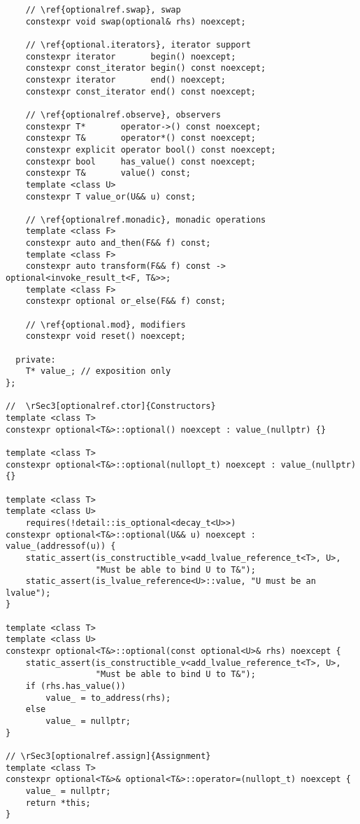 \documentclass[a4paper,10pt,oneside,openany,final,article]{memoir}
\begin{document}
\begin{verbatim}
    // \ref{optionalref.swap}, swap
    constexpr void swap(optional& rhs) noexcept;

    // \ref{optional.iterators}, iterator support
    constexpr iterator       begin() noexcept;
    constexpr const_iterator begin() const noexcept;
    constexpr iterator       end() noexcept;
    constexpr const_iterator end() const noexcept;

    // \ref{optionalref.observe}, observers
    constexpr T*       operator->() const noexcept;
    constexpr T&       operator*() const noexcept;
    constexpr explicit operator bool() const noexcept;
    constexpr bool     has_value() const noexcept;
    constexpr T&       value() const;
    template <class U>
    constexpr T value_or(U&& u) const;

    // \ref{optionalref.monadic}, monadic operations
    template <class F>
    constexpr auto and_then(F&& f) const;
    template <class F>
    constexpr auto transform(F&& f) const -> optional<invoke_result_t<F, T&>>;
    template <class F>
    constexpr optional or_else(F&& f) const;

    // \ref{optional.mod}, modifiers
    constexpr void reset() noexcept;

  private:
    T* value_; // exposition only
};

//  \rSec3[optionalref.ctor]{Constructors}
template <class T>
constexpr optional<T&>::optional() noexcept : value_(nullptr) {}

template <class T>
constexpr optional<T&>::optional(nullopt_t) noexcept : value_(nullptr) {}

template <class T>
template <class U>
    requires(!detail::is_optional<decay_t<U>>)
constexpr optional<T&>::optional(U&& u) noexcept : value_(addressof(u)) {
    static_assert(is_constructible_v<add_lvalue_reference_t<T>, U>,
                  "Must be able to bind U to T&");
    static_assert(is_lvalue_reference<U>::value, "U must be an lvalue");
}

template <class T>
template <class U>
constexpr optional<T&>::optional(const optional<U>& rhs) noexcept {
    static_assert(is_constructible_v<add_lvalue_reference_t<T>, U>,
                  "Must be able to bind U to T&");
    if (rhs.has_value())
        value_ = to_address(rhs);
    else
        value_ = nullptr;
}

// \rSec3[optionalref.assign]{Assignment}
template <class T>
constexpr optional<T&>& optional<T&>::operator=(nullopt_t) noexcept {
    value_ = nullptr;
    return *this;
}


\end{verbatim}
\end{document}
